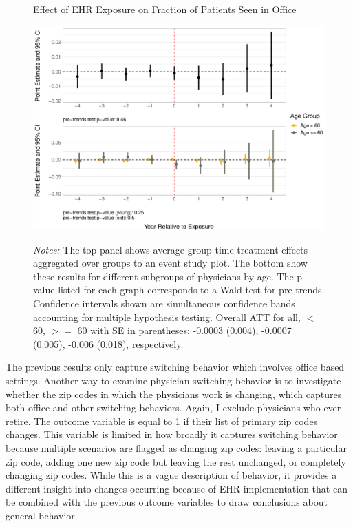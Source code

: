 \documentclass[12pt]{article}
\begin{document}
\begin{figure}[ht]
    \centering
    \captionsetup{width=.85\linewidth}
    \caption{Effect of EHR Exposure on Fraction of Patients Seen in Office}
    \includegraphics[scale=.6]{Objects/officefrac__plot.pdf}
    \label{fig:officesecond}
    \vspace{2mm}
    \caption*{\footnotesize{\textit{Notes:} The top panel shows average group time treatment effects aggregated over groups to an event study plot. The bottom show these results for different subgroups of physicians by age. The p-value listed for each graph corresponds to a Wald test for pre-trends. Confidence intervals shown are simultaneous confidence bands accounting for multiple hypothesis testing. Overall ATT for all, $<$ 60, $>=$ 60 with SE in parentheses: -0.0003 (0.004), -0.0007 (0.005), -0.006 (0.018), respectively.}}
\end{figure}

The previous results only capture switching behavior which involves office based settings. Another way to examine physician switching behavior is to investigate whether the zip codes in which the physicians work is changing, which captures both office and other switching behaviors. Again, I exclude physicians who ever retire. The outcome variable is equal to 1 if their list of primary zip codes changes. This variable is limited in how broadly it captures switching behavior because multiple scenarios are flagged as changing zip codes: leaving a particular zip code, adding one new zip code but leaving the rest unchanged, or completely changing zip codes. While this is a vague description of behavior, it provides a different insight into changes occurring because of EHR implementation that can be combined with the previous outcome variables to draw conclusions about general behavior.
\end{document}
